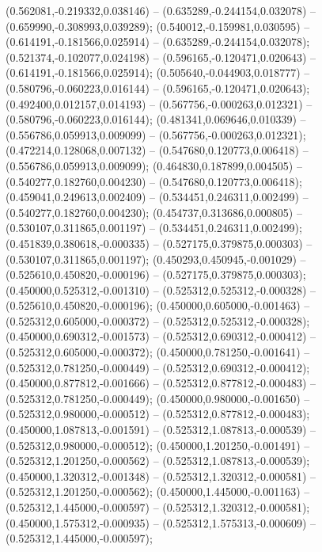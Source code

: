  (0.562081,-0.219332,0.038146) -- (0.635289,-0.244154,0.032078) -- (0.659990,-0.308993,0.039289);
 (0.540012,-0.159981,0.030595) -- (0.614191,-0.181566,0.025914) -- (0.635289,-0.244154,0.032078);
 (0.521374,-0.102077,0.024198) -- (0.596165,-0.120471,0.020643) -- (0.614191,-0.181566,0.025914);
 (0.505640,-0.044903,0.018777) -- (0.580796,-0.060223,0.016144) -- (0.596165,-0.120471,0.020643);
 (0.492400,0.012157,0.014193) -- (0.567756,-0.000263,0.012321) -- (0.580796,-0.060223,0.016144);
 (0.481341,0.069646,0.010339) -- (0.556786,0.059913,0.009099) -- (0.567756,-0.000263,0.012321);
 (0.472214,0.128068,0.007132) -- (0.547680,0.120773,0.006418) -- (0.556786,0.059913,0.009099);
 (0.464830,0.187899,0.004505) -- (0.540277,0.182760,0.004230) -- (0.547680,0.120773,0.006418);
 (0.459041,0.249613,0.002409) -- (0.534451,0.246311,0.002499) -- (0.540277,0.182760,0.004230);
 (0.454737,0.313686,0.000805) -- (0.530107,0.311865,0.001197) -- (0.534451,0.246311,0.002499);
 (0.451839,0.380618,-0.000335) -- (0.527175,0.379875,0.000303) -- (0.530107,0.311865,0.001197);
 (0.450293,0.450945,-0.001029) -- (0.525610,0.450820,-0.000196) -- (0.527175,0.379875,0.000303);
 (0.450000,0.525312,-0.001310) -- (0.525312,0.525312,-0.000328) -- (0.525610,0.450820,-0.000196);
 (0.450000,0.605000,-0.001463) -- (0.525312,0.605000,-0.000372) -- (0.525312,0.525312,-0.000328);
 (0.450000,0.690312,-0.001573) -- (0.525312,0.690312,-0.000412) -- (0.525312,0.605000,-0.000372);
 (0.450000,0.781250,-0.001641) -- (0.525312,0.781250,-0.000449) -- (0.525312,0.690312,-0.000412);
 (0.450000,0.877812,-0.001666) -- (0.525312,0.877812,-0.000483) -- (0.525312,0.781250,-0.000449);
 (0.450000,0.980000,-0.001650) -- (0.525312,0.980000,-0.000512) -- (0.525312,0.877812,-0.000483);
 (0.450000,1.087813,-0.001591) -- (0.525312,1.087813,-0.000539) -- (0.525312,0.980000,-0.000512);
 (0.450000,1.201250,-0.001491) -- (0.525312,1.201250,-0.000562) -- (0.525312,1.087813,-0.000539);
 (0.450000,1.320312,-0.001348) -- (0.525312,1.320312,-0.000581) -- (0.525312,1.201250,-0.000562);
 (0.450000,1.445000,-0.001163) -- (0.525312,1.445000,-0.000597) -- (0.525312,1.320312,-0.000581);
 (0.450000,1.575312,-0.000935) -- (0.525312,1.575313,-0.000609) -- (0.525312,1.445000,-0.000597);
